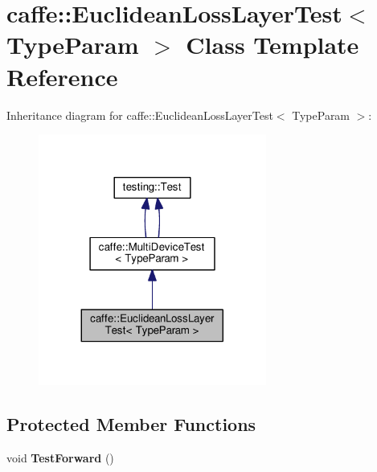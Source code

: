 \hypertarget{classcaffe_1_1_euclidean_loss_layer_test}{}\section{caffe\+:\+:Euclidean\+Loss\+Layer\+Test$<$ Type\+Param $>$ Class Template Reference}
\label{classcaffe_1_1_euclidean_loss_layer_test}


Inheritance diagram for caffe\+:\+:Euclidean\+Loss\+Layer\+Test$<$ Type\+Param $>$\+:
\nopagebreak
\begin{figure}[H]
\begin{center}
\leavevmode
\includegraphics[width=212pt]{classcaffe_1_1_euclidean_loss_layer_test__inherit__graph}
\end{center}
\end{figure}
\subsection*{Protected Member Functions}
\begin{DoxyCompactItemize}
\item 
\mbox{\label{classcaffe_1_1_euclidean_loss_layer_test_a51485e3e7834563decab7392e556e3e6}} 
void {\bfseries Test\+Forward} ()
\end{DoxyCompactItemize}
